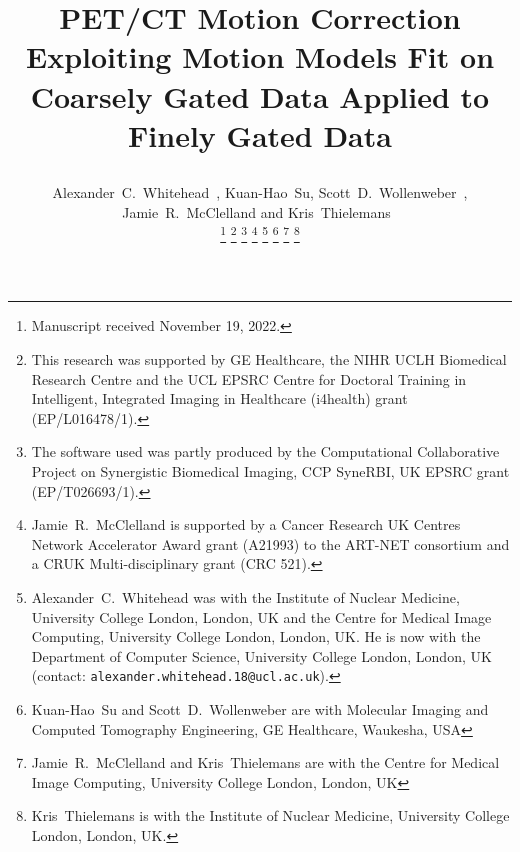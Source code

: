 \documentclass[10pt, twocolumn, twoside, letterpaper]{IEEEtran}
\begin{document}
\title{

    PET/CT Motion Correction Exploiting Motion Models Fit on Coarsely Gated Data Applied to Finely Gated Data
}

\pagestyle{plain}

\author{
    
    Alexander~C.~Whitehead~,
    Kuan-Hao~Su,
    Scott~D.~Wollenweber~,
    Jamie~R.~McClelland and
    Kris~Thielemans~

    \thanks{Manuscript received November 19, 2022.}
    \thanks{This research was supported by GE Healthcare, the NIHR UCLH Biomedical Research Centre and the UCL EPSRC Centre for Doctoral Training in Intelligent, Integrated Imaging in Healthcare (i4health) grant (EP/L016478/1).}
    \thanks{The software used was partly produced by the Computational Collaborative Project on Synergistic Biomedical Imaging, CCP SyneRBI, UK EPSRC grant (EP/T026693/1).}
    \thanks{Jamie~R.~McClelland is supported by a Cancer Research UK Centres Network Accelerator Award grant (A21993) to the ART-NET consortium and a CRUK Multi-disciplinary grant (CRC 521).}
    \thanks{Alexander~C.~Whitehead was with the Institute of Nuclear Medicine, University College London, London, UK and the Centre for Medical Image Computing, University College London, London, UK. He is now with the Department of Computer Science, University College London, London, UK (contact: \texttt{alexander.whitehead.18@ucl.ac.uk}).}
    \thanks{Kuan-Hao~Su and Scott~D.~Wollenweber are with Molecular Imaging and Computed Tomography Engineering, GE Healthcare, Waukesha, USA}
    \thanks{Jamie~R.~McClelland and Kris~Thielemans are with the Centre for Medical Image Computing, University College London, London, UK}
    \thanks{Kris~Thielemans is with the Institute of Nuclear Medicine, University College London, London, UK.}
}

\maketitle
\IEEEpeerreviewmaketitle
\end{document}

